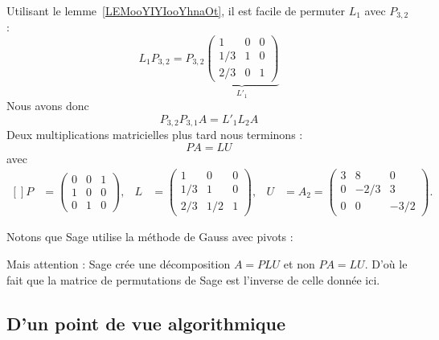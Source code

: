 \begin{example}
	Utilisant le lemme~\ref{LEMooYIYIooYhnaOt}, il est facile de permuter \( L_{1}\) avec \( P_{3,2}\) :
	\begin{equation}
		L_1P_{3,2}=P_{3,2}
		\underbrace{
			\begin{pmatrix}
				1   & 0 & 0 \\
				1/3 & 1 & 0 \\
				2/3 & 0 & 1
			\end{pmatrix}}_{L'_1}
	\end{equation}
	Nous avons donc
	\begin{equation}
		P_{3,2}P_{3,1}A=L'_1L_2A
	\end{equation}
	Deux multiplications matricielles plus tard nous terminons :
	\begin{equation}
		PA=LU
	\end{equation}
	avec
	\begin{equation}
		\begin{aligned}[]
			P & =\begin{pmatrix}
				     0 & 0 & 1 \\
				     1 & 0 & 0 \\
				     0 & 1 & 0
			     \end{pmatrix},     &
			L & =\begin{pmatrix}
				     1   & 0   & 0 \\
				     1/3 & 1   & 0 \\
				     2/3 & 1/2 & 1
			     \end{pmatrix},     &
			U & =A_2=\begin{pmatrix}
				         3 & 8    & 0    \\
				         0 & -2/3 & 3    \\
				         0 & 0    & -3/2
			         \end{pmatrix}.
		\end{aligned}
	\end{equation}
\end{example}

Notons que Sage utilise la méthode de Gauss avec pivots :

Mais attention : Sage crée une décomposition \( A=PLU\) et non \( PA=LU\). D'où le fait que la matrice de permutations de Sage est l'inverse de celle donnée ici.

\subsection{D'un point de vue algorithmique}

